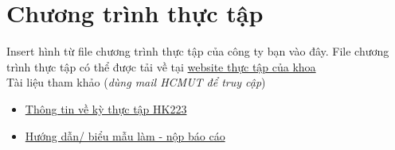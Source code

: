 \section{Chương trình thực tập}
Insert hình từ file chương trình thực tập của công ty bạn vào đây. File chương trình thực tập có thể được tải về tại  \href{https://internship.cse.hcmut.edu.vn/}{website thực tập của khoa}
\\ Tài liệu tham khảo (\textit{dùng mail HCMUT để truy cập}) 
\begin{itemize}
    \item \href{https://drive.google.com/drive/folders/14CMDiKPhv96uZfpnd93wn4q-H5ru1kap?usp=share_link }{Thông tin về kỳ thực tập HK223}
    \item \href{https://drive.google.com/drive/folders/1KR1yhCCZYzp2QifAMwU5VtFU5_aP-F6y?usp=share_link}{Hướng dẫn/ biểu mẫu làm - nộp báo cáo}
\end{itemize} 